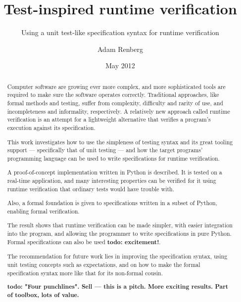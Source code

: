 \documentclass[a4paper,11pt]{kth-mag}
\title{Test-inspired runtime verification}
\subtitle{Using a unit test-like specification syntax for runtime verification}
\author{Adam Renberg}
\date{May 2012}
\newcommand{\todo}[1]{\textbf{todo: #1}}
\begin{document}


\frontmatter
\pagestyle{empty}
\removepagenumbers
\maketitle
{}





\begin{abstract}

Computer software are growing ever more complex, and more sophisticated tools
are required to make sure the software operates correctly. Traditional
approaches, like formal methods and testing, suffer from complexity, difficulty
and rarity of use, and incompleteness and informality, respectively. A
relatively new approach called runtime verification is an attempt for a
lightweight alternative that verifies a program's execution against its
specification.

This work investigates how to use the simpleness of testing syntax and its
great tooling support --- specifically that of unit testing --- and how the
target programs' programming language can be used to write specifications for
runtime verification.

A proof-of-concept implementation written in Python is described. It is tested
on a real-time application, and many interesting properties can be verified for
it using runtime verification that ordinary tests would have trouble with.

Also, a formal foundation is given to specifications written in a subset of
Python, enabling formal verification.

The result shows that runtime verification can be made simpler, with easier
integration into the program, and allowing the programmer to write
specifications in pure Python. Formal specifications can also be used
\todo{excitement!}.

The recommendation for future work lies in improving the specification syntax,
using unit testing concepts such as expectations, and on how to make the formal
specification syntax more like that for its non-formal cousin.

\todo{"Four punchlines". Sell --- this is a pitch. More exciting results. Part
of toolbox, lots of value.}


\end{abstract}
\clearpage
\end{document}
